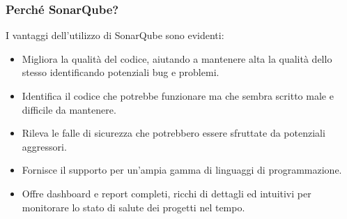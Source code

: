         \subsubsection{Perché SonarQube?}
            I vantaggi dell'utilizzo di SonarQube sono evidenti:
            \begin{itemize}
                \item Migliora la qualità del codice, aiutando a mantenere alta la qualità dello stesso identificando potenziali bug e problemi.
                \item Identifica il codice che potrebbe funzionare ma che sembra scritto male e difficile da mantenere.
                \item Rileva le falle di sicurezza che potrebbero essere sfruttate da potenziali aggressori.
                \item Fornisce il supporto per un'ampia gamma di linguaggi di programmazione.
                \item Offre dashboard e report completi, ricchi di dettagli ed intuitivi per monitorare lo stato di salute dei progetti nel tempo.
            \end{itemize}